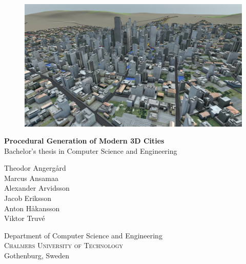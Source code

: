 \begin{titlepage}

  \begin{figure}[H]
    \centering
    \vspace{2cm}	%
    \includegraphics[width=0.9\linewidth]{figure/modern-city.png}
  \end{figure}

  \renewcommand{\familydefault}{\sfdefault} \normalfont %
  \textbf{{\Huge Procedural Generation of Modern 3D Cities}} 	\\[0.5cm]
  Bachelor's thesis in Computer Science and Engineering \setlength{\parskip}{1cm}

  {\Large
    Theodor Angergård \\[0.1cm]
    Marcus Ansamaa \\[0.1cm]
    Alexander Arvidsson \\[0.1cm]
    Jacob Eriksson \\[0.1cm]
    Anton Håkansson \\[0.1cm]
    Viktor Truvé \\[0.1cm]
  }

  Department of Computer Science and Engineering \\
  \textsc{Chalmers University of Technology} \\
  Gothenburg, Sweden \the\year

  \renewcommand{\familydefault}{\rmdefault} \normalfont %
  \vfill	
\end{titlepage}

\newpage
\restoregeometry
\thispagestyle{empty}
\mbox{}


